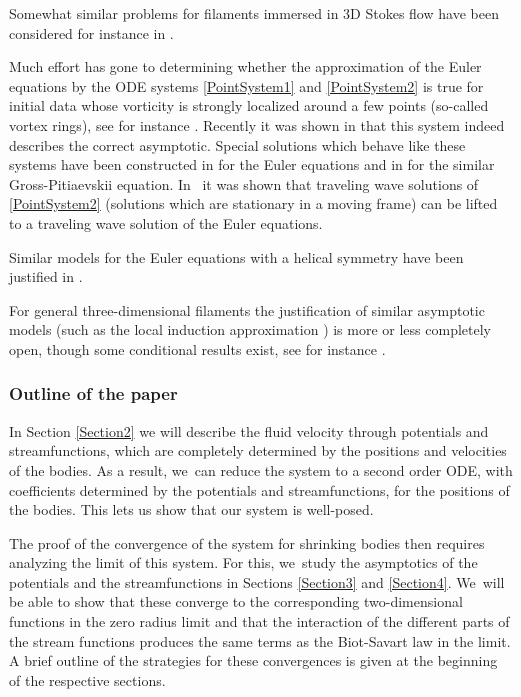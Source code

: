 \documentclass[10pt]{amsart}
\theoremstyle{definition}
\begin{document}
Somewhat similar problems for filaments immersed in 3D Stokes flow have been considered for instance in \cite{MR4373666,mori2020theoretical}.

Much effort has gone to determining whether the approximation of the Euler equations by the ODE systems \eqref{PointSystem1} and \eqref{PointSystem2} is true for initial data whose vorticity is strongly localized around a few points (so-called vortex rings), see for instance \cite{benedetto2000motion,butta2022vanishing, ButtaMarchioro}. Recently it was shown in \cite{butta2023leapfrogging} that this system indeed describes the correct asymptotic. Special solutions which behave like these systems have been constructed in \cite{Davila2022leapfrogging} for the Euler equations and in \cite{JerrardSmets} for the similar Gross-Pitiaevskii equation. In~\cite{ao2022clustered} it was shown that traveling wave solutions of \eqref{PointSystem2} (\ie solutions which are stationary in a moving frame) can be lifted to a traveling wave solution of the Euler equations.

Similar models for the Euler equations with a helical symmetry have been justified \eg in \cite{donati2024dynamics}.

For general three-dimensional filaments the justification of similar asymptotic models (such as the local induction approximation \cite[\S 2]{banica2013evolution}) is more or less completely open, though some conditional results exist, see for instance \cite{jerrard2017vortex}.

\subsubsection*{Outline of the paper}
In Section \ref{Section2} we will describe the fluid velocity through potentials and streamfunctions, which are completely determined by the positions and velocities of the bodies. As a result, we~can reduce the system to a second order ODE, with coefficients determined by the potentials and streamfunctions, for the positions of the bodies. This lets us show that our system is well-posed.

The proof of the convergence of the system for shrinking bodies then requires analyzing the limit of this system. For this, we~study the asymptotics of the potentials and the streamfunctions in Sections \ref{Section3} and \ref{Section4}. We~will be able to show that these converge to the corresponding two-dimensional functions in the zero radius limit and that the interaction of the different parts of the stream functions produces the same terms as the Biot-Savart law in the limit. A brief outline of the strategies for these convergences is given at the beginning of the respective sections.
\end{document}

